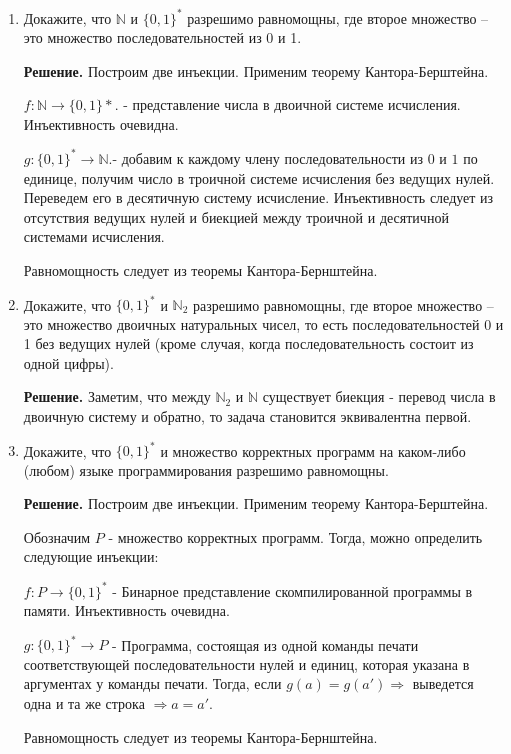 \begin{enumerate}

\item Докажите, что $\mathbb{N}$ и $\{0,1\}^*$ разрешимо равномощны, где второе множество -- это множество 
последовательностей из 0 и 1.

\textbf{Решение.} Построим две инъекции. Применим теорему Кантора-Берштейна. 

$f:\mathbb{N} \rightarrow \{0, 1\}*$. - представление числа в двоичной системе исчисления. Инъективность 
очевидна.

$g:\{0,1\}^* \rightarrow \mathbb{N}$.- добавим к каждому члену последовательности из $0$ и $1$ по единице, 
получим число в троичной системе исчисления без ведущих нулей. Переведем его в десятичную систему исчисление. 
Инъективность следует из отсутствия ведущих нулей и биекцией между троичной и десятичной системами 
исчисления. 

Равномощность следует из теоремы Кантора-Бернштейна.

\item Докажите, что $\{0,1\}^*$ и $\mathbb{N}_2$ разрешимо равномощны, где второе множество -- это множество 
двоичных натуральных чисел, то есть последовательностей 0 и 1 без ведущих нулей (кроме случая, когда     
последовательность состоит из одной цифры).
    
\textbf{Решение.} Заметим, что между $\mathbb{N}_2$ и $\mathbb{N}$ существует биекция - перевод числа в 
двоичную систему и обратно, то задача становится эквивалентна первой.   

\item Докажите, что $\{0,1\}^*$ и множество корректных программ на каком-либо (любом) языке программирования 
разрешимо равномощны.

\textbf{Решение.} Построим две инъекции. Применим теорему Кантора-Берштейна. 

Обозначим $P$ - множество корректных программ. Тогда, можно определить следующие инъекции:

$f:P \rightarrow \{0,1\}^*$ - Бинарное представление скомпилированной программы в памяти. Инъективность 
очевидна.


$g:\{0,1\}^* \rightarrow P$ - Программа, состоящая из одной команды печати соответствующей последовательности 
нулей и единиц, которая указана в аргументах у команды печати. Тогда, если $g(a) = g(a') \Rightarrow $ 
выведется одна и та же строка $\Rightarrow a = a'$. 

Равномощность следует из теоремы Кантора-Бернштейна.


\end{enumerate}

